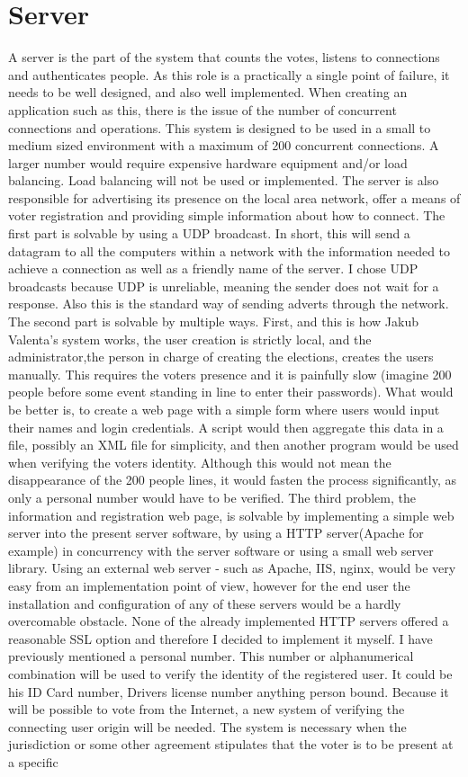 \documentclass[11pt,twoside,a4paper]{book}
\begin{document}
\section{Server}
A server is the part of the system that counts the votes, listens to connections and authenticates people. As this role is a practically a single point of failure, it needs to be well designed, and also well implemented. When creating an application such as this, there is the issue of the number of concurrent connections and operations. This system is designed to be used in a small to medium sized environment with a maximum of 200 concurrent connections. A larger number would require expensive hardware equipment and/or load balancing. Load balancing will not be used or implemented. The server is also responsible for advertising its presence on the local area network, offer a means of voter registration and providing simple information about how to connect. The first part is solvable by using a UDP\cite{whatIsUPD} broadcast\cite{whatIsBroadcasting}. In short, this will send a datagram to all the computers within a network with the information needed to achieve a connection as well as a friendly name of the server. I chose UDP broadcasts because UDP is unreliable, meaning the sender does not wait for a response. Also this is the standard way of sending adverts through the network. The second part is solvable by multiple ways. First, and this is how Jakub Valenta's system works, the user creation is strictly local, and the administrator,the person in charge of creating the elections, creates the users manually. This requires the voters presence and  it is painfully slow (imagine 200 people before some event standing in line to enter their passwords). What would be better is, to create a web page with a simple form where users would input their names and login credentials. A script would then aggregate this data in a file, possibly an XML file for simplicity, and then another program would be used when verifying the voters identity. Although this would not mean the disappearance of the 200 people lines, it would fasten the process significantly, as only a personal number would have to be verified. The third problem, the information and registration web page, is solvable by implementing a simple web server into the present server software, by using a HTTP server(Apache for example)  in concurrency with the server software or using a small web server library. Using an external web server - such as Apache, IIS, nginx, would be very easy from an implementation point of view, however for the end user the installation and configuration of any of these servers would be a hardly overcomable obstacle. None of the already implemented HTTP servers offered a reasonable SSL option and therefore I decided to implement it myself. I have previously mentioned a personal number. This number or alphanumerical combination will be used to verify the identity of the registered user. It could be his ID Card number, Drivers license number anything person bound. Because it will be possible to vote from the Internet, a new system of verifying the connecting user origin will be needed. The system is necessary when the jurisdiction or some other agreement stipulates that the voter is to be present at a specific 
\end{document}
